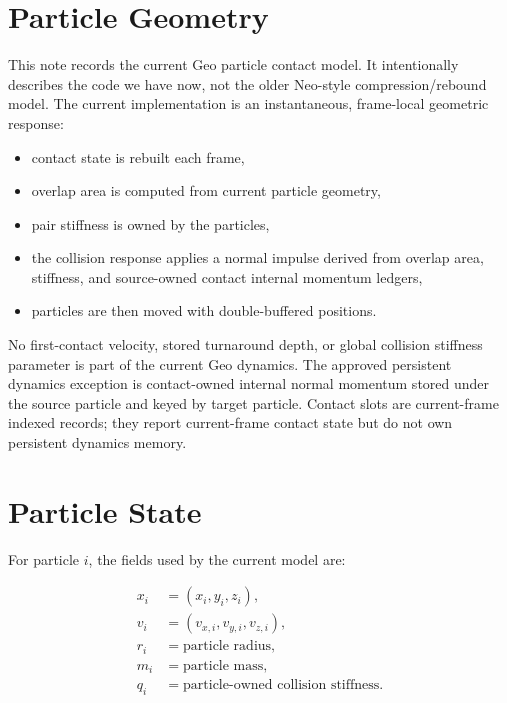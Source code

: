 \section{Particle Geometry}
\label{sec:particle-geometry}

This note records the current Geo particle contact model.  It intentionally
describes the code we have now, not the older Neo-style compression/rebound
model.  The current implementation is an instantaneous, frame-local geometric
response:

\begin{itemize}[leftmargin=*]
    \item contact state is rebuilt each frame,
    \item overlap area is computed from current particle geometry,
    \item pair stiffness is owned by the particles,
    \item the collision response applies a normal impulse derived from overlap
    area, stiffness, and source-owned contact internal momentum ledgers,
    \item particles are then moved with double-buffered positions.
\end{itemize}

No first-contact velocity, stored turnaround depth, or global collision
stiffness parameter is part of the current Geo dynamics.  The approved
persistent dynamics exception is contact-owned internal normal momentum stored
under the source particle and keyed by target particle.  Contact slots are
current-frame indexed records; they report current-frame contact state but do
not own persistent dynamics memory.

\section{Particle State}
\label{sec:particle-state}

For particle $i$, the fields used by the current model are:

\begin{equation}
\begin{aligned}
x_i &= (x_i,y_i,z_i), \\
v_i &= (v_{x,i},v_{y,i},v_{z,i}), \\
r_i &= \text{particle radius}, \\
m_i &= \text{particle mass}, \\
q_i &= \text{particle-owned collision stiffness}.
\end{aligned}
\end{equation}

